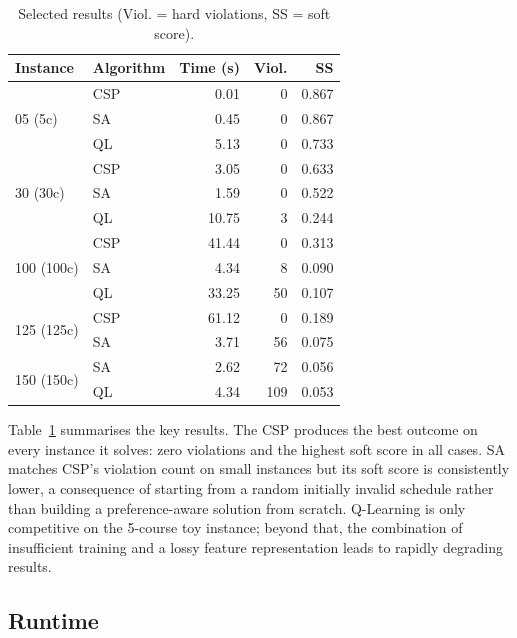 \documentclass[letterpaper]{article}
\begin{document}
\begin{table}[h]
\centering
\caption{Selected results (Viol. = hard violations, SS = soft score).}
\label{tab:results}
\small
\begin{tabular}{@{}llrrr@{}}
\toprule
Instance & Algorithm & Time (s) & Viol. & SS \\
\midrule
\multirow{3}{*}{05 (5c)}   & CSP &  0.01 &  0 & 0.867 \\
                            & SA  &  0.45 &  0 & 0.867 \\
                            & QL  &  5.13 &  0 & 0.733 \\
\midrule
\multirow{3}{*}{30 (30c)}  & CSP &  3.05 &  0 & 0.633 \\
                            & SA  &  1.59 &  0 & 0.522 \\
                            & QL  & 10.75 &  3 & 0.244 \\
\midrule
\multirow{3}{*}{100 (100c)}& CSP & 41.44 &  0 & 0.313 \\
                            & SA  &  4.34 &  8 & 0.090 \\
                            & QL  & 33.25 & 50 & 0.107 \\
\midrule
\multirow{2}{*}{125 (125c)}& CSP & 61.12 &  0 & 0.189 \\
                            & SA  &  3.71 & 56 & 0.075 \\
\midrule
\multirow{2}{*}{150 (150c)}& SA  &  2.62 & 72 & 0.056 \\
                            & QL  &  4.34 &109 & 0.053 \\
\bottomrule
\end{tabular}
\end{table}

Table~\ref{tab:results} summarises the key results. The CSP produces the best outcome on every instance it solves: zero violations and the highest soft score in all cases. SA matches CSP's violation count on small instances but its soft score is consistently lower, a consequence of starting from a random initially invalid schedule rather than building a preference-aware solution from scratch. Q-Learning is only competitive on the 5-course toy instance; beyond that, the combination of insufficient training and a lossy feature representation leads to rapidly degrading results.

\subsection{Runtime}
\end{document}
